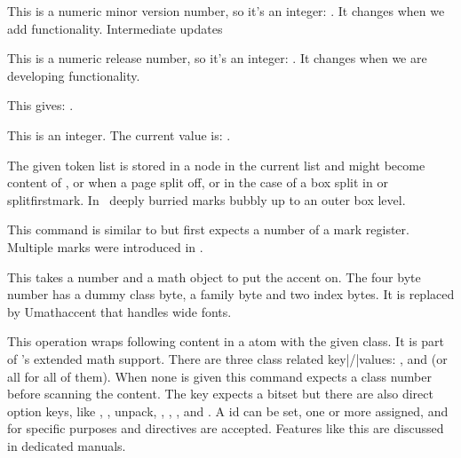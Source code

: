 \startnewprimitive[title={\prm {luametatexminorversion}}]

This is a numeric minor version number, so it's an integer: \the
\luametatexminorversion. It changes when we add functionality. Intermediate
updates

\stopnewprimitive

\startnewprimitive[title={\prm {luametatexrelease}}]

This is a numeric release number, so it's an integer: \the\luametatexrelease. It
changes when we are developing functionality.

\stopnewprimitive

\startnewprimitive[title={\prm {luatexbanner}}]

This gives: {\tttf \luatexbanner}.

\stopnewprimitive

\startnewprimitive[title={\prm {luametatexversion}}]

This is an integer. The current value is: {\tttf \number\luametatexversion}.

\stopnewprimitive

\startoldprimitive[title={\prm {mark}}][obsolete=yes]

The given token list is stored in a node in the current list and might become
content of ,  or  when a page split
off, or in the case of a box split in  or \prm
{splitfirstmark}. In \LUAMETATEX\ deeply burried marks bubbly up to an outer box
level.

\stopoldprimitive

\startoldprimitive[title={\prm {marks}}]

This command is similar to  but first expects a number of a mark
register. Multiple marks were introduced in \ETEX.

\stopoldprimitive

\startoldprimitive[title={\prm {mathaccent}}][obsolete=yes]

This takes a number and a math object to put the accent on. The four byte number
has a dummy class byte, a family byte and two index bytes. It is replaced by \prm
{Umathaccent} that handles wide fonts.

\stopoldprimitive

\startnewprimitive[title={\prm {mathatom}}]

This operation wraps following content in a atom with the given class. It is part
of \LUAMETATEX's extended math support. There are three class related
key|/|values: ,  and  (or \type
{all} for all of them). When none is given this command expects a class number
before scanning the content. The  key expects a bitset but there
are also direct option keys, like , , \type
{unpack}, , , ,  and
. A  id can be set, one or more 
assigned, and for specific purposes  and 
directives are accepted. Features like this are discussed in dedicated manuals.

